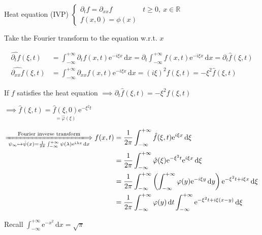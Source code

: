 \begin{example}
    Heat equation (IVP) $\begin{cases}
            \partial_tf=\partial_{xx}f & t\geq 0,\ x\in\mathbb{R} \\
            f(x,0)=\phi(x)
        \end{cases}$

    Take the Fourier transform to the equation w.r.t. $x$

    \begin{align*}
        \widehat{\partial_tf}(\xi,t)    & =\int_{-\infty}^{+\infty}\partial_tf(x,t)\mathrm{e}^{-i\xi x}\,\mathrm{d}x=\partial_t\int_{-\infty}^{+\infty}f(x,t)\mathrm{e}^{-i\xi x}\,\mathrm{d}x=\partial_t\hat{f}(\xi,t) \\
        \widehat{\partial_{xx}f}(\xi,t) & =\int_{-\infty}^{+\infty}\partial_{xx}f(x,t)\mathrm{e}^{-i\xi x}\,\mathrm{d}x=(i\xi)^2\hat{f}(\xi,t)=-\xi^2\hat{f}(\xi,t)
    \end{align*}

    If $f$ satisfies the heat equation $\implies\partial_t\hat{f}(\xi,t)=-\xi^2\hat{f}(\xi,t)$

    $\implies\hat{f}(\xi,t)=\underset{=\hat{\varphi}(\xi)}{\hat{f}(\xi,0)}\mathrm{e}^{-\xi^2t}$

    \begin{align*}
        \xLongrightarrow[{\psi_{\infty}\mapsto\hat{\psi}(x)=\frac{1}{2\pi}\int_{-\infty}^{+\infty}\psi(\lambda)\mathrm{e}^{i\lambda x}\,\mathrm{d}x}]{\text{Fourier inverse transform}}f(x,t)
         & =\frac{1}{2\pi}\int_{-\infty}^{+\infty}\hat{f}(\xi,t)\mathrm{e}^{i\xi x}\,\mathrm{d}\xi                                                                           \\
         & =\frac{1}{2\pi}\int_{-\infty}^{+\infty}\hat{\varphi}(\xi)\mathrm{e}^{-\xi^2t}\mathrm{e}^{i\xi x}\,\mathrm{d}\xi                                                   \\
         & =\frac{1}{2\pi}\int_{-\infty}^{+\infty}\left(\int_{-\infty}^{+\infty}\varphi(y)\mathrm{e}^{-i\xi y}\,\mathrm{d}y\right)\mathrm{e}^{-\xi^2t+i\xi x}\,\mathrm{d}\xi \\
         & =\frac{1}{2\pi}\int_{-\infty}^{+\infty}\varphi(y)\,\mathrm{d}t\int_{-\infty}^{+\infty}\mathrm{e}^{-\xi^2t+i\xi (x-y)}\,\mathrm{d}\xi
    \end{align*}

    Recall $\int_{-\infty}^{+\infty}\mathrm{e}^{-x^2}\,\mathrm{d}x=\sqrt{\pi}$


\end{example}
